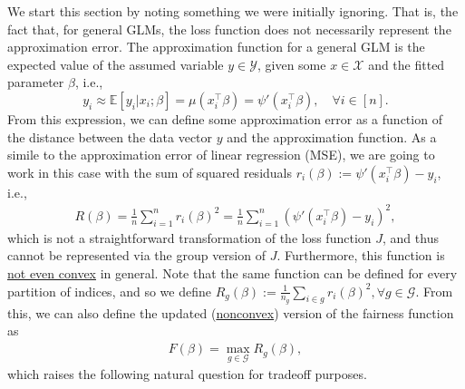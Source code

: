 \documentclass[11pt]{article}
\theoremstyle{plain}
\theoremstyle{definition}
\newcommand{\1}{\mathbf{1}}
\newcommand{\Y}{\mathcal{Y}}
\newcommand{\X}{\mathcal{X}}
\newcommand{\G}{\mathcal{G}}
\renewcommand{\t}{^{\top}}
\newcommand{\Expected}[1]{\mathbb{E}[#1]}
\begin{document}
We start this section by noting something we were initially ignoring. That is, the fact that, for general GLMs, the loss function does not necessarily represent the approximation error. The approximation function for a general GLM is the expected value of the assumed variable $y\in\Y$, given some $x\in \X$ and the fitted parameter $\beta$, i.e., $$y_i \approx \Expected{y_i|x_i;\beta}=\mu(x_i\t \beta)=\psi'(x_i\t \beta), \quad \forall i \in [n].$$
 From this expression, we can define some approximation error as a function of the distance between the data vector $y$ and the approximation function. As a simile to the approximation error of linear regression (MSE), we are going to work in this case with the sum of squared residuals $r_i(\beta):=\psi'(x_i\t \beta)-y_i$, i.e.,
 \begin{align*}
     R(\beta)=\frac{1}{n}\sum_{i=1}^nr_i(\beta)^2=\frac{1}{n}\sum_{i=1}^n\left(\psi'(x_i\t \beta)-y_i\right)^2,
 \end{align*}
 which is not a straightforward transformation of the loss function $J$, and thus cannot be represented via the group version of $J$. Furthermore, this function is \underline{not even convex} in general. Note that the same function can be defined for every partition of indices, and so we define $R_g(\beta):=\frac{1}{n_g}\sum_{i\in g}r_i(\beta)^2, \forall g\in \G$. From this, we can also define the updated (\underline{nonconvex}) version of the fairness function as
 \begin{align*}
     F(\beta)=\max_{g\in \G} R_g(\beta),
 \end{align*}
which raises the following natural question for tradeoff purposes.\\
\end{document}
